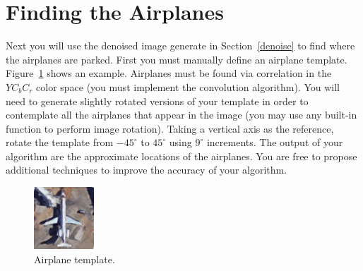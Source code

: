 \documentclass[paper=a4, fontsize=11pt]{scrartcl} %
\numberwithin{equation}{section} %
\numberwithin{figure}{section} %
\numberwithin{table}{section} %
\begin{document}
\clearpage
\section{Finding the Airplanes}

Next you will use the denoised image generate in Section~\ref{denoise} to find where the airplanes are parked. First you must manually define an airplane template. Figure~\ref{fig:template} shows an example. Airplanes must be found via correlation in the $YC_bC_r$ color space (you must implement the convolution algorithm). You will need to generate slightly rotated versions of your template in order to contemplate all the airplanes that appear in the image (you may use any built-in function to perform image rotation). Taking a vertical axis as the reference, rotate the template from $-45^\circ$ to $45^\circ$ using $9^\circ$ increments. The output of your algorithm are the approximate locations of the airplanes. You are free to propose additional techniques to improve the accuracy of your algorithm.  

\begin{figure}[h]
	\centering
	\includegraphics[width=0.2\textwidth]{airplane.png}
	\caption{Airplane template.}
	\label{fig:template}
\end{figure}

\end{document}
